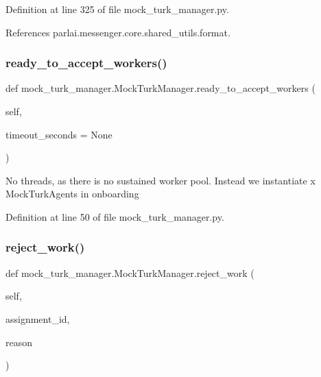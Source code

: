 Definition at line 325 of file mock\+\_\+turk\+\_\+manager.\+py.



References parlai.\+messenger.\+core.\+shared\+\_\+utils.\+format.

\mbox{\label{classmock__turk__manager_1_1MockTurkManager_a24f972e7c54d6eb8a7c2dbe906018353}} 
\subsubsection{\texorpdfstring{ready\+\_\+to\+\_\+accept\+\_\+workers()}{ready\_to\_accept\_workers()}}
{\footnotesize\ttfamily def mock\+\_\+turk\+\_\+manager.\+Mock\+Turk\+Manager.\+ready\+\_\+to\+\_\+accept\+\_\+workers (\begin{DoxyParamCaption}\item[{}]{self,  }\item[{}]{timeout\+\_\+seconds = {\ttfamily None} }\end{DoxyParamCaption})}

\begin{DoxyVerb}No threads, as there is no sustained worker pool. Instead
we instantiate x MockTurkAgents in onboarding\end{DoxyVerb}
 

Definition at line 50 of file mock\+\_\+turk\+\_\+manager.\+py.

\mbox{\label{classmock__turk__manager_1_1MockTurkManager_a9042a50ac1a0e858872e3e1f3ea85af5}} 
\subsubsection{\texorpdfstring{reject\+\_\+work()}{reject\_work()}}
{\footnotesize\ttfamily def mock\+\_\+turk\+\_\+manager.\+Mock\+Turk\+Manager.\+reject\+\_\+work (\begin{DoxyParamCaption}\item[{}]{self,  }\item[{}]{assignment\+\_\+id,  }\item[{}]{reason }\end{DoxyParamCaption})}



